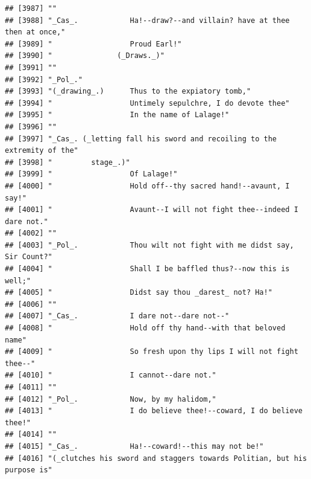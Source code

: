 \documentclass{article}\usepackage[]{graphicx}\usepackage[]{color}
\makeatletter
\newenvironment{kframe}{%
 \def\at@end@of@kframe{}%
 \ifinner\ifhmode%
  \def\at@end@of@kframe{\end{minipage}}%
  \begin{minipage}{\columnwidth}%
 \fi\fi%
 \def\FrameCommand##1{\hskip\@totalleftmargin \hskip-\fboxsep
 \colorbox{shadecolor}{##1}\hskip-\fboxsep
     \hskip-\linewidth \hskip-\@totalleftmargin \hskip\columnwidth}%
 \MakeFramed {\advance\hsize-\width
   \@totalleftmargin\z@ \linewidth\hsize
   \@setminipage}}%
 {\par\unskip\endMakeFramed%
 \at@end@of@kframe}
\newenvironment{knitrout}{}{} %
\makeatother
\begin{document}
\begin{knitrout}
\begin{kframe}
\begin{verbatim}
## [3987] ""                                                                            
## [3988] "_Cas_.            Ha!--draw?--and villain? have at thee then at once,"       
## [3989] "                  Proud Earl!"                                               
## [3990] "               (_Draws._)"                                                   
## [3991] ""                                                                            
## [3992] "_Pol_."                                                                      
## [3993] "(_drawing_.)      Thus to the expiatory tomb,"                               
## [3994] "                  Untimely sepulchre, I do devote thee"                      
## [3995] "                  In the name of Lalage!"                                    
## [3996] ""                                                                            
## [3997] "_Cas_. (_letting fall his sword and recoiling to the extremity of the"       
## [3998] "         stage_.)"                                                           
## [3999] "                  Of Lalage!"                                                
## [4000] "                  Hold off--thy sacred hand!--avaunt, I say!"                
## [4001] "                  Avaunt--I will not fight thee--indeed I dare not."         
## [4002] ""                                                                            
## [4003] "_Pol_.            Thou wilt not fight with me didst say, Sir Count?"         
## [4004] "                  Shall I be baffled thus?--now this is well;"               
## [4005] "                  Didst say thou _darest_ not? Ha!"                          
## [4006] ""                                                                            
## [4007] "_Cas_.            I dare not--dare not--"                                    
## [4008] "                  Hold off thy hand--with that beloved name"                 
## [4009] "                  So fresh upon thy lips I will not fight thee--"            
## [4010] "                  I cannot--dare not."                                       
## [4011] ""                                                                            
## [4012] "_Pol_.            Now, by my halidom,"                                       
## [4013] "                  I do believe thee!--coward, I do believe thee!"            
## [4014] ""                                                                            
## [4015] "_Cas_.            Ha!--coward!--this may not be!"                            
## [4016] "(_clutches his sword and staggers towards Politian, but his purpose is"      

\end{verbatim}
\end{kframe}
\end{knitrout}
\end{document}
